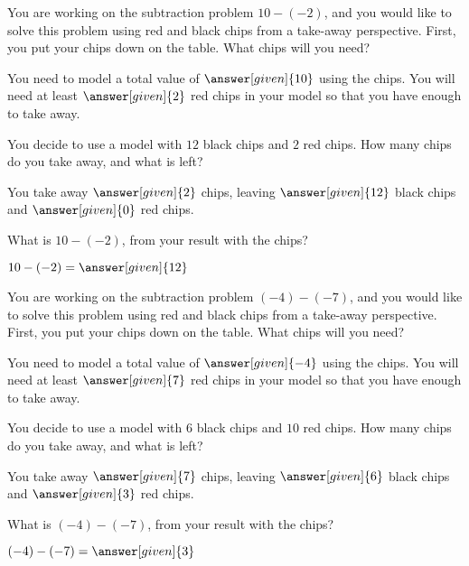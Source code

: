 \documentclass[nooutcomes]{ximera}
\begin{document}
\begin{question}
You are working on the subtraction problem $10 - (-2)$, and you would like to solve this problem using red and black chips from a take-away perspective.  First, you put your chips down on the table.  What chips will you need?

\begin{prompt}
You need to model a total value of $\answer[given]{10}$ using the chips.  You will need at least $\answer[given]{2}$ red chips in your model so that you have enough to take away.
\end{prompt}
\begin{question}
You decide to use a model with $12$ black chips and $2$ red chips.  How many chips do you take away, and what is left?

\begin{prompt}
You take away $\answer[given]{2}$  chips, leaving $\answer[given]{12}$ black chips and $\answer[given]{0}$ red chips.
\end{prompt}
\begin{question}
What is $10 - (-2)$, from your result with the chips?

\begin{prompt}
$10 - (-2) = \answer[given]{12}$
\end{prompt}
\end{question}
\end{question}
\end{question}


\begin{question}
You are working on the subtraction problem $(-4) - (-7)$, and you would like to solve this problem using red and black chips from a take-away perspective.  First, you put your chips down on the table.  What chips will you need?

\begin{prompt}
You need to model a total value of $\answer[given]{-4}$ using the chips.  You will need at least $\answer[given]{7}$ red chips in your model so that you have enough to take away.
\end{prompt}

\begin{question}
You decide to use a model with $6$ black chips and $10$ red chips.  How many chips do you take away, and what is left?

\begin{prompt}
You take away $\answer[given]{7}$  chips, leaving $\answer[given]{6}$ black chips and $\answer[given]{3}$ red chips.
\end{prompt}

\begin{question}
What is $(-4) - (-7)$, from your result with the chips?

\begin{prompt}
$(-4) - (-7) = \answer[given]{3}$
\end{prompt}
\end{question}
\end{question}
\end{question}
\end{document}
